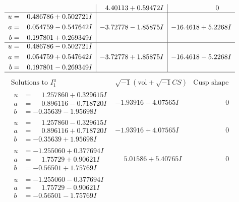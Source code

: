\documentclass[1p]{elsarticle_modified}
\theoremstyle{definition}
\newcommand{\I}{\sqrt{-1}}
\begin{document}
$$\begin{array}{c|c|c}
 & \phantom{-}4.40113 + 0.59472 I & \phantom{-0.000000 } 0 \\ \hline\begin{aligned}
u &= \phantom{-}0.486786 + 0.502721 I \\
a &= \phantom{-}0.054759 - 0.547642 I \\
b &= \phantom{-}0.197801 + 0.269349 I\end{aligned}
 & -3.72778 - 1.85875 I & -16.4618 + 5.2268 I \\ \hline\begin{aligned}
u &= \phantom{-}0.486786 - 0.502721 I \\
a &= \phantom{-}0.054759 + 0.547642 I \\
b &= \phantom{-}0.197801 - 0.269349 I\end{aligned}
 & -3.72778 + 1.85875 I & -16.4618 - 5.2268 I\\
 \hline 
 \end{array}$$\newpage$$\begin{array}{c|c|c}  
\text{Solutions to }I^u_{1}& \I (\text{vol} + \sqrt{-1}CS) & \text{Cusp shape}\\
 \hline 
\begin{aligned}
u &= \phantom{-}1.257860 + 0.329615 I \\
a &= \phantom{-}0.896116 - 0.718720 I \\
b &= -0.35639 - 1.95698 I\end{aligned}
 & -1.93916 - 4.07565 I & \phantom{-0.000000 } 0 \\ \hline\begin{aligned}
u &= \phantom{-}1.257860 - 0.329615 I \\
a &= \phantom{-}0.896116 + 0.718720 I \\
b &= -0.35639 + 1.95698 I\end{aligned}
 & -1.93916 + 4.07565 I & \phantom{-0.000000 } 0 \\ \hline\begin{aligned}
u &= -1.255060 + 0.377694 I \\
a &= \phantom{-}1.75729 + 0.90621 I \\
b &= -0.56501 + 1.75769 I\end{aligned}
 & \phantom{-}5.01586 + 5.40765 I & \phantom{-0.000000 } 0 \\ \hline\begin{aligned}
u &= -1.255060 - 0.377694 I \\
a &= \phantom{-}1.75729 - 0.90621 I \\
b &= -0.56501 - 1.75769 I\end{aligned}

\end{array}$$
\end{document}
